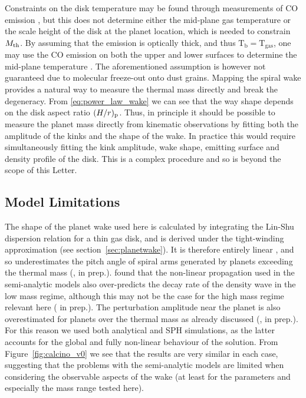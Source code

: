 Constraints on the disk temperature may be found through measurements of CO emission \citep[e.g.][]{pinte2018},
but this does not determine either the mid-plane gas temperature or the scale height of the disk at the planet location, which is needed to constrain $M_{\rm th}$.
By assuming that the emission is optically thick, and thus $\mathrm{T_b}=\mathrm{T_{gas}}$, one may use the CO emission on both the upper and lower surfaces to determine the mid-plane temperature \citep{dullemond2020}.
The aforementioned assumption is however not guaranteed due to molecular freeze-out onto dust grains.
Mapping the spiral wake provides a natural way to measure the thermal mass directly and break the degeneracy.
From \ref{eq:power_law_wake} we can see that the way shape depends on the disk aspect ratio $(H/r)_{\rm p}$.
Thus, in principle it should be possible to measure the planet mass directly from kinematic observations by fitting both the amplitude of the kinks and the shape of the wake.
In practice this would require simultaneously fitting the kink amplitude, wake shape, emitting surface and density profile of the disk.
This is a complex procedure and so is beyond the scope of this Letter.
%
\subsection{Model Limitations} \label{sec:limitations}

The shape of the planet wake used here is calculated by integrating the Lin-Shu dispersion relation for a thin gas disk, and is derived under the tight-winding approximation (see section~\ref{sec:planetwake}).
It is therefore entirely linear \citep{ogilvie2002}, and so underestimates the pitch angle of spiral arms generated by planets exceeding the thermal mass (\citealt{zhu2015,bae2018a,cimerman2021}, \citeauthor{fasanoinprep.} in prep.).
\citet{cimerman2021} found that the non-linear propagation used in the semi-analytic models also over-predicts the decay rate of the density wave in the low mass regime, although this may not be the case for the high mass regime relevant here (\citeauthor{fasanoinprep.} in prep.).
The perturbation amplitude near the planet is also overestimated for planets over the thermal mass as already discussed (\citealt{goodman2001}, \citeauthor{fasanoinprep.} in prep.).
For this reason we used both analytical and SPH simulations, as the latter accounts for the global and fully non-linear behaviour of the solution.
From Figure~\ref{fig:calcino_v0} we see that the results are very similar in each case, suggesting that the problems with the semi-analytic models are limited when considering the observable aspects of the wake (at least for the parameters and especially the mass range tested here).

